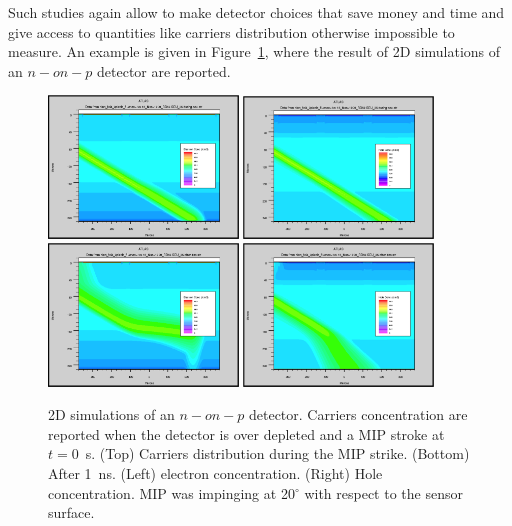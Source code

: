 Such studies again allow to make detector choices that save money and time and give access to 
quantities like carriers distribution otherwise impossible to measure. An example is given in 
Figure~\ref{fig:carr_conc}, where the result of 2D simulations of an  $n-on-p$ detector 
are reported.
\begin{figure}[!htbp]
\centering
\includegraphics[width=0.45\textwidth]{econ_early.png}
\includegraphics[width=0.45\textwidth]{hcon_early.png}
\includegraphics[width=0.45\textwidth]{econ_late.png}
\includegraphics[width=0.45\textwidth]{hcon_late.png}
\caption{\label{fig:carr_conc}2D simulations of an $n-on-p$ detector. Carriers concentration
are reported when the detector is over depleted and a MIP stroke at $t=0$~s. 
(Top) Carriers distribution during the MIP strike. (Bottom) After 1~ns. (Left) electron concentration. 
(Right) Hole concentration. MIP was impinging at 20$^{\circ}$ with respect to the sensor surface.}
\end{figure}
